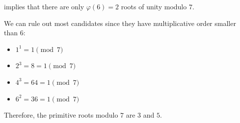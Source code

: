 \begin{example}
\begin{thmenum}
      implies that there are only \( \varphi(6) = 2 \) roots of unity modulo \( 7 \).

    We can rule out most candidates since they have multiplicative order smaller than \( 6 \):
    \begin{itemize}
      \item \( 1^1 = 1 \pmod 7 \)
      \item \( 2^3 = 8 = 1 \pmod 7 \)
      \item \( 4^3 = 64 = 1 \pmod 7 \)
      \item \( 6^2 = 36 = 1 \pmod 7 \)
    \end{itemize}

    Therefore, the primitive roots modulo \( 7 \) are \( 3 \) and \( 5 \).
  \end{thmenum}
\end{example}

